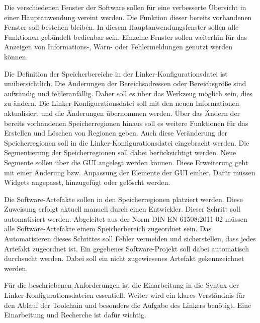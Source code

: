 \begin{description}[style=nextline]
	\item[Gruppierung der Einzelfenster]
	Die verschiedenen Fenster der Software sollen für eine verbesserte Übersicht in einer Hauptanwendung vereint werden.
	Die Funktion dieser bereits vorhandenen Fenster soll bestehen bleiben.
	In diesem Hauptanwendungsfenster sollen alle Funktionen gebündelt bedienbar sein.
	Einzelne Fenster sollen weiterhin für das Anzeigen von Informations-, Warn- oder Fehlermeldungen genutzt werden können.
	
	\item[Manipulation der Speicherbereiche]
	Die Definition der Speicherbereiche in der Linker-Konfigurationsdatei ist unübersichtlich.
	Die Änderungen der Bereichsadressen oder Bereichsgröße sind aufwändig und fehleranfällig.
	Daher soll es über das Werkzeug möglich sein, dies zu ändern.
	Die Linker-Konfigurationsdatei soll mit den neuen Informationen aktualisiert und die Änderungen übernommen werden.
	Über das Ändern der bereits vorhandenen Speicherregionen hinaus soll es weitere Funktionen für das Erstellen und Löschen von Regionen geben.
	Auch diese Veränderung der Speicherregionen soll in die Linker-Konfigurationsdatei eingebracht werden.
	Die Segmentierung der Speicherregionen soll dabei berücksichtigt werden.
	Neue Segmente sollen über die \ac{GUI} angelegt werden können.
	Diese Erweiterung geht mit einer Änderung bzw. Anpassung der Elemente der \ac{GUI} einher.
	Dafür müssen Widgets angepasst, hinzugefügt oder gelöscht werden.
	
	\item[Artefaktzuweisung der Speicherregionen]
	Die Software-Artefakte sollen in den Speicherregionen platziert werden.
	Diese Zuweisung erfolgt aktuell manuell durch einen Entwickler.
	Dieser Schritt soll automatisiert werden.
	Abgeleitet aus der Norm DIN EN 61508:2011-02 müssen alle Software-Artefakte einem Speicherbereich zugeordnet sein.
	Das Automatisieren dieses Schrittes soll Fehler vermeiden und sicherstellen, dass jedes Artefakt zugeordnet ist.
	Ein gegebenes Software-Projekt soll dabei automatisch durchsucht werden.
	Dabei soll ein nicht zugewiesenes Artefakt gekennzeichnet werden.
\end{description}

Für die beschriebenen Anforderungen ist die Einarbeitung in die Syntax der Linker-Konfigurationsdateien essentiell.
Weiter wird ein klares Verständnis für den Ablauf der Toolchain und besonders die Aufgabe des Linkers benötigt.
Eine Einarbeitung und Recherche ist dafür wichtig.\\

